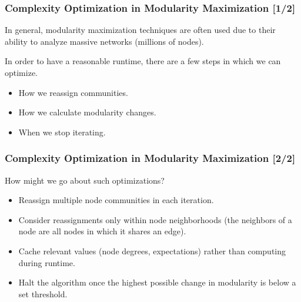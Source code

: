 \documentclass{beamer}
\begin{document}
\begin{frame}

    \frametitle{Complexity Optimization in Modularity Maximization [1/2]}

    In general, modularity maximization techniques are often used due to their ability to analyze massive networks (millions of nodes).\pause

    \vspace{2.5mm}
    In order to have a reasonable runtime, there are a few steps in which we can optimize.\pause

    \vspace{2.5mm}
    \begin{itemize}
        \item How we reassign communities.\pause
        \item How we calculate modularity changes.\pause
        \item When we stop iterating.
    \end{itemize}

\end{frame}

\begin{frame}

    \frametitle{Complexity Optimization in Modularity Maximization [2/2]}

    How might we go about such optimizations?

    \vspace{2.5mm}
    \begin{itemize}
        \item Reassign multiple node communities in each iteration.\pause
        \item Consider reassignments only within node neighborhoods (the neighbors of a node are all nodes in which it shares an edge).\pause
        \item Cache relevant values (node degrees, expectations) rather than computing during runtime.\pause
        \item Halt the algorithm once the highest possible change in modularity is below a set threshold.
    \end{itemize}

\end{frame}

\end{document}
